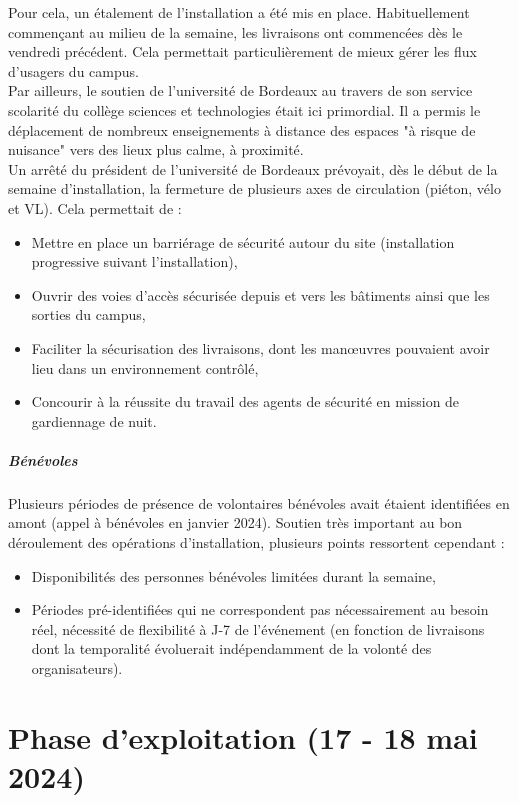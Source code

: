 \documentclass[12pt,a4paper]{report}
\begin{document}
Pour cela, un étalement de l'installation a été mis en place. Habituellement commençant au milieu de la semaine, les livraisons ont commencées dès le vendredi précédent. Cela permettait particulièrement de mieux gérer les flux d'usagers du campus.\\

Par ailleurs, le soutien de l'université de Bordeaux au travers de son service scolarité du collège sciences et technologies était ici primordial. Il a permis le déplacement de nombreux enseignements à distance des espaces "à risque de nuisance" vers des lieux plus calme, à proximité.\\

Un arrêté du président de l'université de Bordeaux prévoyait, dès le début de la semaine d'installation, la fermeture de plusieurs axes de circulation (piéton, vélo et VL). Cela permettait de :
\begin{itemize}
\item Mettre en place un barriérage de sécurité autour du site (installation progressive suivant l'installation),
\item Ouvrir des voies d'accès sécurisée depuis et vers les bâtiments ainsi que les sorties du campus,
\item Faciliter la sécurisation des livraisons, dont les manœuvres pouvaient avoir lieu dans un environnement contrôlé,
\item Concourir à la réussite du travail des agents de sécurité en mission de gardiennage de nuit.\\
\end{itemize}

\subparagraph{Bénévoles}

Plusieurs périodes de présence de volontaires bénévoles avait étaient identifiées en amont (appel à bénévoles en janvier 2024). Soutien très important au bon déroulement des opérations d'installation, plusieurs points ressortent cependant : 
\begin{itemize}
\item Disponibilités des personnes bénévoles limitées durant la semaine,
\item Périodes pré-identifiées qui ne correspondent pas nécessairement au besoin réel, nécessité de flexibilité à J-7 de l'événement (en fonction de livraisons dont la temporalité évoluerait indépendamment de la volonté des organisateurs).
\end{itemize}

\section{Phase d'exploitation (17 - 18 mai 2024)}
\end{document}
